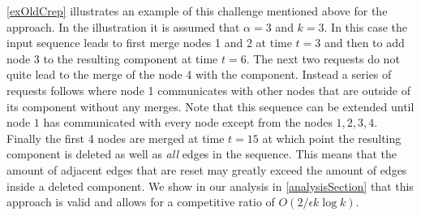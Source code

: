 \documentclass[a4paper,xcolor=dvipsnames, tikz, 12pt]{article}
\newcommand{\crep}{\text{C{\scriptsize REP}}}
\newcommand{\adjDel}{\text{C{\scriptsize REP}-A{\scriptsize DJ}}}
\theoremstyle{definition}
\begin{document}
	
	\cref{exOldCrep} illustrates an example of this challenge mentioned above for the \adjDel{} approach. In the illustration it is assumed that $\alpha=3$ and $k=3$. In this case the input sequence leads \adjDel{} to first merge nodes 1 and 2 at time $t=3$ and then to add node 3 to the resulting component at time $t= 6$. The next two requests do not quite lead to the merge of the node 4 with the component. Instead a series of requests follows where node 1 communicates with other nodes that are outside of its component without any merges. Note that this sequence can be extended until node $1$ has communicated with every node except from the nodes $1,2,3,4$. Finally the first 4 nodes are merged at time $t=15$ at which point the resulting component is deleted as well as \textit{all} edges in the sequence.
	This means that the amount of adjacent edges that are reset may greatly exceed the amount of edges inside a deleted component.
	We show in our analysis in \cref{analysisSection} that this approach is valid and allows for a competitive ratio of $O(2/\epsilon k\log k)$.
		
	
	
	
	
	
	
\end{document}
